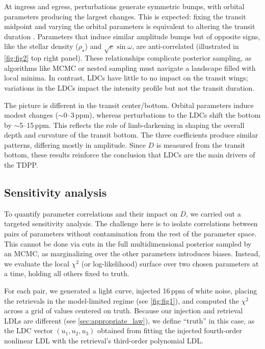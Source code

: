 \documentclass[twocolumn]{aastex631}
\begin{document}
At ingress and egress, perturbations generate symmetric bumps, with orbital parameters producing the largest changes. This is expected: fixing the transit midpoint and varying the orbital parameters is equivalent to altering the transit duration \citep{Seager2003}. Parameters that induce similar amplitude bumps but of opposite signs, like the stellar density ($\rho_{\star}$) and $\sqrt{e}\sin{\omega}$, are anti-correlated (illustrated in \autoref{fig:fig2} top right panel). These relationships complicate posterior sampling, as algorithms like MCMC or nested sampling must navigate a landscape filled with local minima. In contrast, LDCs have little to no impact on the transit wings; variations in the LDCs impact the intensity profile but not the transit duration. 

The picture is different in the transit center/bottom. Orbital parameters induce modest changes ($\sim$0--3\,ppm), whereas perturbations to the LDCs shift the bottom by $\sim$5--15\,ppm. This reflects the role of limb-darkening in shaping the overall depth and curvature of the transit bottom. The three coefficients produce similar patterns, differing mostly in amplitude. Since $D$ is measured from the transit bottom, these results reinforce the conclusion that LDCs are the main drivers of the TDPP. 



\subsection{Sensitivity analysis}\label{sec:sensitivity_analysis}

To quantify parameter correlations and their impact on $D$, we carried out a targeted sensitivity analysis. The challenge here is to isolate correlations between pairs of parameters without contamination from the rest of the parameter space. This cannot be done via cuts in the full multidimensional posterior sampled by an MCMC, as marginalizing over the other parameters introduces biases. Instead, we evaluate the local $\chi^2$ (or log-likelihood) surface over two chosen parameters at a time, holding all others fixed to truth.

For each pair, we generated a light curve, injected 16\,ppm of white noise, placing the retrievals in the model-limited regime (see \autoref{fig:fig1}), and computed the $\chi^2$ across a grid of values centered on truth. Because our injection and retrieval LDLs are different (see \autoref{sec:appropriate_law}), we define ``truth'' in this case, as the LDC vector $(u_1, u_2, u_3)$ obtained from fitting the injected fourth-order nonlinear LDL with the retrieval's third-order polynomial LDL.
\end{document}
